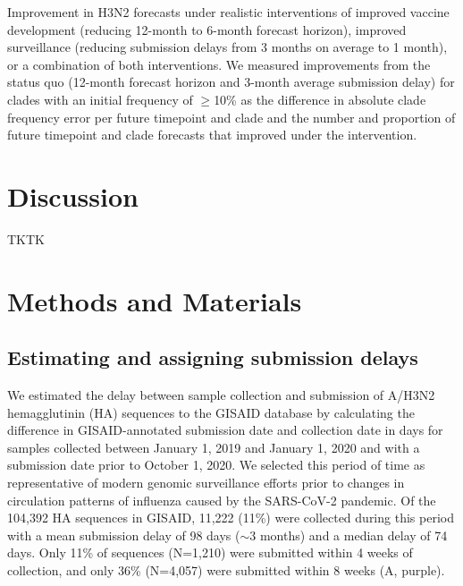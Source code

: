 \documentclass[9pt,lineno]{elife}
\begin{document}
\begin{table}[htb]
  \begin{center}
    
    \caption{Improvement in H3N2 forecasts under realistic interventions of improved vaccine development (reducing 12-month to 6-month forecast horizon), improved surveillance (reducing submission delays from 3 months on average to 1 month), or a combination of both interventions.
      We measured improvements from the status quo (12-month forecast horizon and 3-month average submission delay) for clades with an initial frequency of $\geq$10\% as the difference in absolute clade frequency error per future timepoint and clade and the number and proportion of future timepoint and clade forecasts that improved under the intervention.}
    \label{tab:h3n2_effects_of_realistic_interventions}
  \end{center}
\end{table}

\section{Discussion}

TKTK

\section{Methods and Materials}

\subsection{Estimating and assigning submission delays}

We estimated the delay between sample collection and submission of A/H3N2 hemagglutinin (HA) sequences to the GISAID database \citep{gisaid} by calculating the difference in GISAID-annotated submission date and collection date in days for samples collected between January 1, 2019 and January 1, 2020 and with a submission date prior to October 1, 2020.
We selected this period of time as representative of modern genomic surveillance efforts prior to changes in circulation patterns of influenza caused by the SARS-CoV-2 pandemic.
Of the 104,392 HA sequences in GISAID, 11,222 (11\%) were collected during this period with a mean submission delay of 98 days ($\sim$3 months) and a median delay of 74 days.
Only 11\% of sequences (N=1,210) were submitted within 4 weeks of collection, and only 36\% (N=4,057) were submitted within 8 weeks (A, purple).
\end{document}
